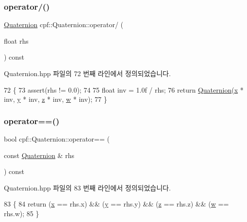 \subsubsection{\texorpdfstring{operator/()}{operator/()}}
{\footnotesize\ttfamily \hyperlink{classcpf_1_1_quaternion}{Quaternion} cpf\+::\+Quaternion\+::operator/ (\begin{DoxyParamCaption}\item[{float}]{rhs }\end{DoxyParamCaption}) const\hspace{0.3cm}{\ttfamily [inline]}}



Quaternion.\+hpp 파일의 72 번째 라인에서 정의되었습니다.


\begin{DoxyCode}
72                                               \{
73             assert(rhs != 0.0);
74 
75             \textcolor{keywordtype}{float} inv = 1.0f / rhs;
76             \textcolor{keywordflow}{return} \hyperlink{classcpf_1_1_quaternion_aae3cc98fcdb7a419a29db4ee988972bc}{Quaternion}(\hyperlink{classcpf_1_1_quaternion_a200f7bce4e673281af8cc7dd75cb0677}{x} * inv, \hyperlink{classcpf_1_1_quaternion_a4fbade6e58be55a49c94e7f157988136}{y} * inv, \hyperlink{classcpf_1_1_quaternion_ade9c41b717605118e5fdf95d96a843b4}{z} * inv, \hyperlink{classcpf_1_1_quaternion_af312a196b39bb4903b876bc454ac15f8}{w} * inv);
77         \}
\end{DoxyCode}
\mbox{\label{classcpf_1_1_quaternion_ac8b812eebaf1a27cdd844267bb19cf61}} 
\subsubsection{\texorpdfstring{operator==()}{operator==()}}
{\footnotesize\ttfamily bool cpf\+::\+Quaternion\+::operator== (\begin{DoxyParamCaption}\item[{const \hyperlink{classcpf_1_1_quaternion}{Quaternion} \&}]{rhs }\end{DoxyParamCaption}) const\hspace{0.3cm}{\ttfamily [inline]}}



Quaternion.\+hpp 파일의 83 번째 라인에서 정의되었습니다.


\begin{DoxyCode}
83                                                      \{
84             \textcolor{keywordflow}{return} (\hyperlink{classcpf_1_1_quaternion_a200f7bce4e673281af8cc7dd75cb0677}{x} == rhs.x) && (\hyperlink{classcpf_1_1_quaternion_a4fbade6e58be55a49c94e7f157988136}{y} == rhs.y) && (\hyperlink{classcpf_1_1_quaternion_ade9c41b717605118e5fdf95d96a843b4}{z} == rhs.z) && (\hyperlink{classcpf_1_1_quaternion_af312a196b39bb4903b876bc454ac15f8}{w} == rhs.w);
85         \}
\end{DoxyCode}


